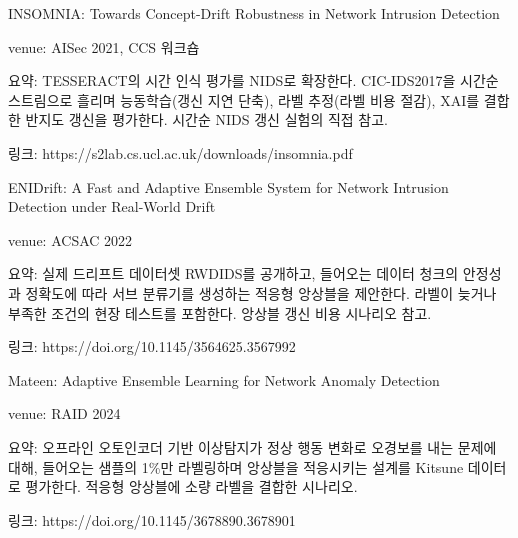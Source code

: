 \par\noindent \textbullet\enspace INSOMNIA: Towards Concept-Drift Robustness in Network Intrusion Detection


\par\noindent \textbullet\enspace venue: AISec 2021, CCS 워크숍


\par\noindent \textbullet\enspace 요약: TESSERACT의 시간 인식 평가를 NIDS로 확장한다. CIC-IDS2017을 시간순 스트림으로 흘리며 능동학습(갱신 지연 단축), 라벨 추정(라벨 비용 절감), XAI를 결합한 반지도 갱신을 평가한다. 시간순 NIDS 갱신 실험의 직접 참고.


\par\noindent \textbullet\enspace 링크: https:/\allowbreak{}/\allowbreak{}s2lab.cs.ucl.ac.uk/\allowbreak{}downloads/\allowbreak{}insomnia.pdf


\par\noindent \textbullet\enspace ENIDrift: A Fast and Adaptive Ensemble System for Network Intrusion Detection under Real-World Drift


\par\noindent \textbullet\enspace venue: ACSAC 2022


\par\noindent \textbullet\enspace 요약: 실제 드리프트 데이터셋 RWDIDS를 공개하고, 들어오는 데이터 청크의 안정성과 정확도에 따라 서브 분류기를 생성하는 적응형 앙상블을 제안한다. 라벨이 늦거나 부족한 조건의 현장 테스트를 포함한다. 앙상블 갱신 비용 시나리오 참고.


\par\noindent \textbullet\enspace 링크: https:/\allowbreak{}/\allowbreak{}doi.org/\allowbreak{}10.1145/\allowbreak{}3564625.3567992


\par\noindent \textbullet\enspace Mateen: Adaptive Ensemble Learning for Network Anomaly Detection


\par\noindent \textbullet\enspace venue: RAID 2024


\par\noindent \textbullet\enspace 요약: 오프라인 오토인코더 기반 이상탐지가 정상 행동 변화로 오경보를 내는 문제에 대해, 들어오는 샘플의 1\%만 라벨링하며 앙상블을 적응시키는 설계를 Kitsune 데이터로 평가한다. 적응형 앙상블에 소량 라벨을 결합한 시나리오.


\par\noindent \textbullet\enspace 링크: https:/\allowbreak{}/\allowbreak{}doi.org/\allowbreak{}10.1145/\allowbreak{}3678890.3678901


